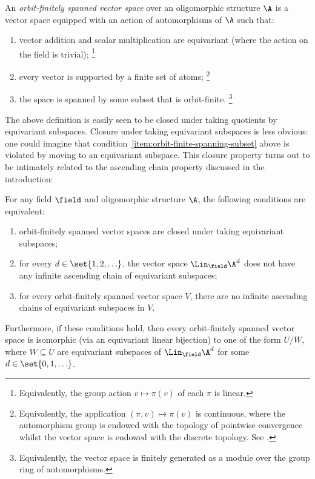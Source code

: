 \begin{definition}\label{def:orbit-finitely-spanned-abstract}
    An \emph{orbit-finitely spanned vector space} over an oligomorphic structure $\A$ is a vector space equipped with an action of automorphisms of $\A$ such that: 
    \begin{enumerate}
        \item \label{item:equivariance-of-vector-space-structure} 
        vector addition and scalar multiplication are equivariant (where the action on the field is trivial);%
        \footnote{Equivalently, the group action $v \mapsto \pi(v)$ of each $\pi$ is linear.}

        \item 
        every vector is supported by a finite set of atoms;%
        \footnote{Equivalently, the application $(\pi, v) \mapsto \pi(v)$ is continuous, where the automorphism group is endowed with the topology of pointwise convergence whilst the vector space is endowed with the discrete topology. 
        See \cite[Lemma~4.1.5]{hodges1993model}.}

        \item \label{item:orbit-finite-spanning-subset} 
        the space is spanned by some subset that is orbit-finite.%
        \footnote{Equivalently, the vector space is finitely generated as a module over the group ring of automorphisms.}
    \end{enumerate}
\end{definition}

The above definition is easily seen to be closed under taking quotients by equivariant subspaces. 
Closure under taking equivariant subspaces is less obvious: 
one could imagine that condition~\eqref{item:orbit-finite-spanning-subset} above is violated by moving to an equivariant subspace. 
This closure property turns out to be intimately related to the ascending chain property discussed in the introduction:

\begin{theorem}\label{thm:ACP}
    For any field $\field$ and oligomorphic structure $\A$, the following conditions are equivalent: 
    \begin{enumerate}
        \item orbit-finitely spanned vector spaces are closed under taking equivariant subspaces; 
        \item for every $d \in \set{1,2,\ldots}$,  the vector space 
        $
        \Lin_\field \A^d
        $ does not have any infinite ascending chain of equivariant subspaces;
        \item for every orbit-finitely spanned vector space $V$, there are no infinite ascending chains of equivariant subspaces in $V$.
    \end{enumerate}
    Furthermore, if these conditions hold, then every orbit-finitely spanned vector space is isomorphic (via an equivariant linear bijection) to one of the form $U/W$, 
    where $W \subseteq U$ are equivariant subspaces of $\Lin_\field \A^d$ for some $d \in \set{0,1,\ldots}$.
\end{theorem}


